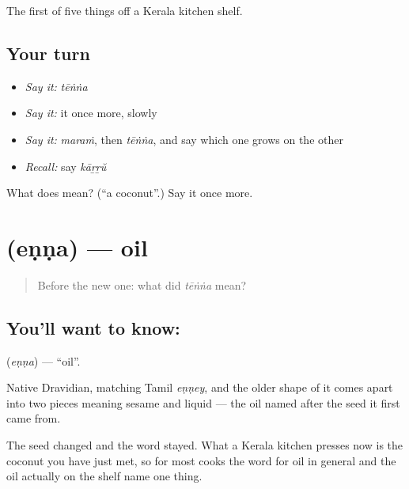 \begin{grammarlens}[title={What you've built}]
The first of five things off a Kerala kitchen shelf.
\end{grammarlens}

\subsection*{Your turn}
\begin{itemize}
\raggedright
  \item \emph{Say it:} \emph{tēṅṅa}
  \item \emph{Say it:} it once more, slowly
  \item \emph{Say it:} \emph{maraṁ}, then \emph{tēṅṅa}, and say which one grows on the other
  \item \emph{Recall:} say \emph{kāṟṟŭ}
\end{itemize}

\begin{tcolorbox}[breakable,colback=teal!4,colframe=teal!35!black,title={Before you move on}]
What does  mean? (\textquotedblleft{}a coconut\textquotedblright{}.) Say it once more.
\end{tcolorbox}
\section[\texorpdfstring{\ml{എണ്ണ} (eṇṇa)}{എണ്ണ (eṇṇa)}]{ (eṇṇa) — oil}

\label{lesson:ML-C61-oil}



\begin{quote}
Before the new one: what did \emph{tēṅṅa} mean?
\end{quote}

\subsection*{You'll want to know: }
\textbf{} (\emph{eṇṇa}) — \textquotedblleft{}oil\textquotedblright{}.

Native Dravidian, matching Tamil \emph{eṇṇey}, and the older shape of it comes apart into two pieces meaning sesame and liquid — the oil named after the seed it first came from.

The seed changed and the word stayed. What a Kerala kitchen presses now is the coconut you have just met, so for most cooks the word for oil in general and the oil actually on the shelf name one thing.

